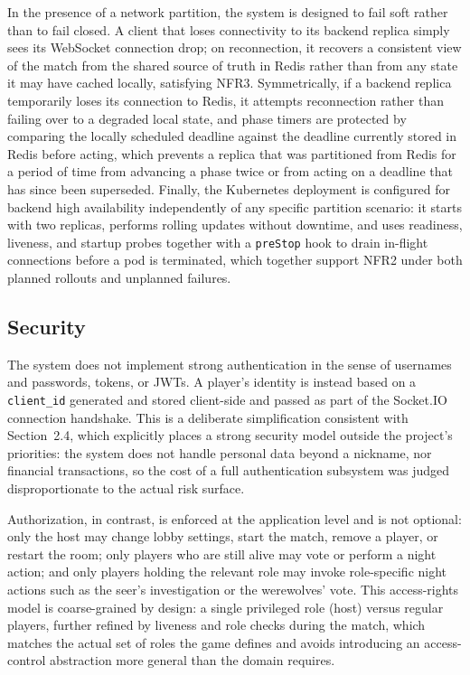 \documentclass{scrartcl}
\begin{document}
In the presence of a network partition, the system is designed to fail soft rather than to fail closed. A client that loses connectivity to its backend replica simply sees its WebSocket connection drop; on reconnection, it recovers a consistent view of the match from the shared source of truth in Redis rather than from any state it may have cached locally, satisfying NFR3. Symmetrically, if a backend replica temporarily loses its connection to Redis, it attempts reconnection rather than failing over to a degraded local state, and phase timers are protected by comparing the locally scheduled deadline against the deadline currently stored in Redis before acting, which prevents a replica that was partitioned from Redis for a period of time from advancing a phase twice or from acting on a deadline that has since been superseded. Finally, the Kubernetes deployment is configured for backend high availability independently of any specific partition scenario: it starts with two replicas, performs rolling updates without downtime, and uses readiness, liveness, and startup probes together with a \texttt{preStop} hook to drain in-flight connections before a pod is terminated, which together support NFR2 under both planned rollouts and unplanned failures.

\subsection{Security}

The system does not implement strong authentication in the sense of usernames and passwords, tokens, or JWTs. A player's identity is instead based on a \texttt{client\_id} generated and stored client-side and passed as part of the Socket.IO connection handshake. This is a deliberate simplification consistent with Section~2.4, which explicitly places a strong security model outside the project's priorities: the system does not handle personal data beyond a nickname, nor financial transactions, so the cost of a full authentication subsystem was judged disproportionate to the actual risk surface.

Authorization, in contrast, is enforced at the application level and is not optional: only the host may change lobby settings, start the match, remove a player, or restart the room; only players who are still alive may vote or perform a night action; and only players holding the relevant role may invoke role-specific night actions such as the seer's investigation or the werewolves' vote. This access-rights model is coarse-grained by design: a single privileged role (host) versus regular players, further refined by liveness and role checks during the match, which matches the actual set of roles the game defines and avoids introducing an access-control abstraction more general than the domain requires.
\end{document}
